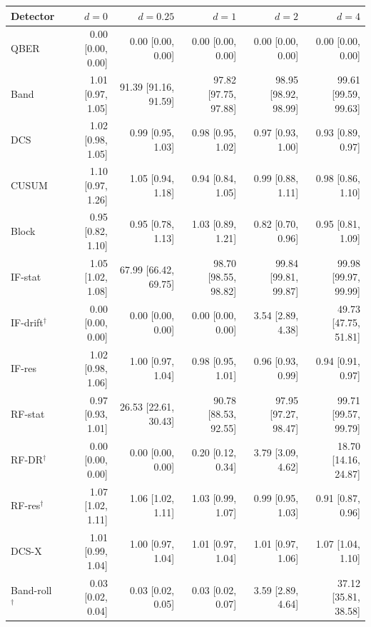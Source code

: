 \begin{tabular}{lrrrrr}
\hline
Detector & $d=0$ & $d=0.25$ & $d=1$ & $d=2$ & $d=4$\\
\hline
QBER & 0.00 [0.00, 0.00] & 0.00 [0.00, 0.00] & 0.00 [0.00, 0.00] & 0.00 [0.00, 0.00] & 0.00 [0.00, 0.00]\\
Band & 1.01 [0.97, 1.05] & 91.39 [91.16, 91.59] & 97.82 [97.75, 97.88] & 98.95 [98.92, 98.99] & 99.61 [99.59, 99.63]\\
DCS & 1.02 [0.98, 1.05] & 0.99 [0.95, 1.03] & 0.98 [0.95, 1.02] & 0.97 [0.93, 1.00] & 0.93 [0.89, 0.97]\\
CUSUM & 1.10 [0.97, 1.26] & 1.05 [0.94, 1.18] & 0.94 [0.84, 1.05] & 0.99 [0.88, 1.11] & 0.98 [0.86, 1.10]\\
Block & 0.95 [0.82, 1.10] & 0.95 [0.78, 1.13] & 1.03 [0.89, 1.21] & 0.82 [0.70, 0.96] & 0.95 [0.81, 1.09]\\
IF-stat & 1.05 [1.02, 1.08] & 67.99 [66.42, 69.75] & 98.70 [98.55, 98.82] & 99.84 [99.81, 99.87] & 99.98 [99.97, 99.99]\\
IF-drift$^\dagger$ & 0.00 [0.00, 0.00] & 0.00 [0.00, 0.00] & 0.00 [0.00, 0.00] & 3.54 [2.89, 4.38] & 49.73 [47.75, 51.81]\\
IF-res & 1.02 [0.98, 1.06] & 1.00 [0.97, 1.04] & 0.98 [0.95, 1.01] & 0.96 [0.93, 0.99] & 0.94 [0.91, 0.97]\\
RF-stat & 0.97 [0.93, 1.01] & 26.53 [22.61, 30.43] & 90.78 [88.53, 92.55] & 97.95 [97.27, 98.47] & 99.71 [99.57, 99.79]\\
RF-DR$^\dagger$ & 0.00 [0.00, 0.00] & 0.00 [0.00, 0.00] & 0.20 [0.12, 0.34] & 3.79 [3.09, 4.62] & 18.70 [14.16, 24.87]\\
RF-res$^\dagger$ & 1.07 [1.02, 1.11] & 1.06 [1.02, 1.11] & 1.03 [0.99, 1.07] & 0.99 [0.95, 1.03] & 0.91 [0.87, 0.96]\\
DCS-X & 1.01 [0.99, 1.04] & 1.00 [0.97, 1.04] & 1.01 [0.97, 1.04] & 1.01 [0.97, 1.06] & 1.07 [1.04, 1.10]\\
Band-roll$^\dagger$ & 0.03 [0.02, 0.04] & 0.03 [0.02, 0.05] & 0.03 [0.02, 0.07] & 3.59 [2.89, 4.64] & 37.12 [35.81, 38.58]\\
\hline
\end{tabular}